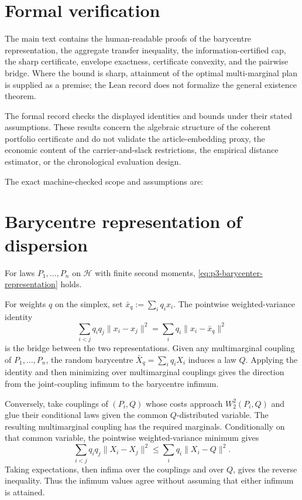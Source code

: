 \section{Formal verification}\label{sec:lean-proofs}

The main text contains the human-readable proofs of the barycentre
representation, the aggregate transfer inequality, the information-certified
cap, the sharp certificate, envelope exactness, certificate convexity, and the
pairwise bridge.
Where the bound is sharp, attainment of the optimal multi-marginal plan is
supplied as a premise; the Lean record does not formalize the general existence
theorem.

The formal record checks the displayed identities and bounds under their
stated assumptions.
These results concern the algebraic structure of the coherent portfolio
certificate and do not validate the article-embedding proxy, the economic
content of the carrier-and-slack restrictions, the empirical distance
estimator, or the chronological evaluation design.

The exact machine-checked scope and assumptions are:
\ppLeanStatusList

\section{Barycentre representation of dispersion}\label{sec:barycentre-appendix}

\begin{proposition}
  \label{prop:p3-barycenter-representation}
  For laws $P_1,\dots,P_n$ on $\mathcal H$ with finite second moments,
  \eqref{eq:p3-barycenter-representation} holds.
\end{proposition}

For weights $q$ on the simplex, set
$\bar x_q:=\sum_i q_i x_i$.
The pointwise weighted-variance identity
\[
  \sum_{i<j}q_i q_j\lVert x_i-x_j\rVert^2
  =\sum_i q_i\lVert x_i-\bar x_q\rVert^2
\]
is the bridge between the two representations.
Given any multimarginal coupling of $P_1,\dots,P_n$, the random barycentre
$\bar X_q=\sum_i q_i X_i$ induces a law $Q$.
Applying the identity and then minimizing over multimarginal couplings gives
the direction from the joint-coupling infimum to the barycentre infimum.

Conversely, take couplings of $(P_i,Q)$ whose costs approach
$W_2^2(P_i,Q)$ and glue their conditional laws given the common
$Q$-distributed variable.
The resulting multimarginal coupling has the required marginals.
Conditionally on that common variable, the pointwise weighted-variance
minimum gives
\[
  \sum_{i<j}q_i q_j\lVert X_i-X_j\rVert^2
  \le \sum_i q_i\lVert X_i-Q\rVert^2.
\]
Taking expectations, then infima over the couplings and over $Q$, gives the
reverse inequality.
Thus the infimum values agree without assuming that either infimum is
attained.


